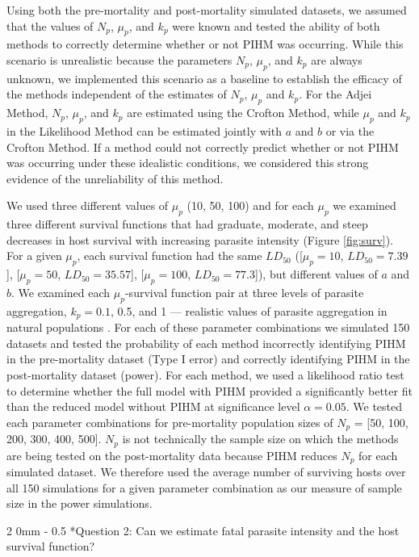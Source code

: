 \documentclass[12pt, a4paper]{article}
\makeatletter
\renewcommand{\subsection}{\@startsection
{subsection}%
{2}%
{0mm}%
{-\baselineskip}%
{0.5\baselineskip}%
{\normalfont\bf}} %
\makeatother
\begin{document}
Using both the pre-mortality and post-mortality simulated datasets,  we assumed
that the values of $N_p$, $\mu_p$, and $k_p$ were known and tested the ability of both methods to correctly determine whether or not PIHM was occurring.  While this scenario is unrealistic because the parameters $N_p$,
$\mu_p$, and $k_p$ are always unknown, we implemented this scenario as a baseline to
establish the efficacy of the methods independent of the estimates of $N_p$, $\mu_p$ and $k_p$.  For the Adjei Method, $N_p$, $\mu_p$, and $k_p$ are estimated using the Crofton Method, while $\mu_p$ and $k_p$ in the Likelihood Method can be estimated jointly with $a$ and $b$ or via the Crofton Method.   If a
method could not correctly predict whether or not PIHM was occurring under these idealistic conditions, we considered this strong evidence of the unreliability of this method.

We used three different values of $\mu_p$ (10, 50, 100) and for each $\mu_p$ we examined three different survival functions that had graduate, moderate, and steep decreases in host survival with increasing parasite intensity (Figure \ref{fig:surv}).  For a given $\mu_p$, each survival function had the same $LD_{50}$ ([$\mu_p = 10$, $LD_{50} = 7.39$], [$\mu_p = 50$, $LD_{50} = 35.57$], [$\mu_p = 100$, $LD_{50}= 77.3$]),  but different values of $a$ and $b$.  We examined each $\mu_p$-survival function pair at  three levels of parasite
aggregation, $k_p = 0.1$, 0.5, and 1 --- realistic values of parasite aggregation in natural populations \citep{Shaw1998}.  For each of these parameter
combinations we simulated 150 datasets and tested the probability of each method incorrectly identifying PIHM in the pre-mortality dataset (Type I error) and correctly identifying PIHM in the post-mortality dataset (power).  For each method, we used a likelihood ratio test to determine whether the full model with PIHM provided a significantly better fit than the reduced model without PIHM at significance level $\alpha = 0.05$.  We tested each parameter combinations for pre-mortality population sizes of $N_p$ = [50, 100, 200, 300, 400, 500]. $N_p$ is not technically the sample size on which the methods are being
tested on the post-mortality data because PIHM reduces $N_p$ for each simulated
dataset.  We therefore used the average number of surviving hosts over all 150 simulations for a given parameter combination as our measure of sample size in the power simulations.

\subsection*{Question 2: Can we estimate fatal parasite intensity and the host survival function?}
\end{document}

